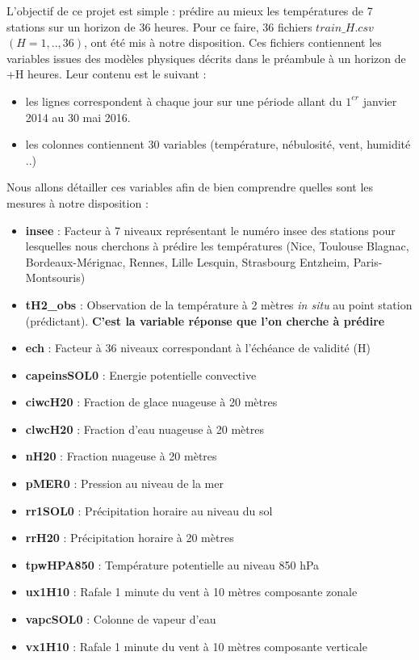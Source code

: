 \documentclass[14pt, openany]{article}
\begin{document}
L'objectif de ce projet est simple : prédire au mieux les températures de 7 stations sur un horizon de 36 heures. Pour ce faire, 36 fichiers $train\_H.csv$ $(H=1,..,36)$, ont été mis à notre disposition. Ces fichiers contiennent les variables issues des modèles physiques décrits dans le préambule à un horizon de +H heures. Leur contenu est le suivant :
\begin{itemize}
\item les lignes correspondent à chaque jour sur une période allant du $1^{er}$ janvier 2014 au 30 mai 2016.
\item les colonnes contiennent 30 variables (température, nébulosité, vent, humidité ..)
\end{itemize}
Nous allons détailler ces variables afin de bien comprendre quelles sont les mesures à notre disposition :
\begin{itemize}
\item \textbf{insee} : Facteur à 7 niveaux représentant le numéro insee des stations pour lesquelles nous cherchons à prédire les températures (Nice, Toulouse Blagnac, Bordeaux-Mérignac, Rennes, Lille Lesquin, Strasbourg Entzheim, Paris-Montsouris)
\item \textbf{tH2\_obs} : Observation de la température à 2 mètres \textit{in situ} au point station (prédictant). \textbf{C'est la variable réponse que l'on cherche à prédire}
\item \textbf{ech} : Facteur à 36 niveaux correspondant à l'échéance de validité (H)
\item \textbf{capeinsSOL0} : Energie potentielle convective
\item \textbf{ciwcH20} : Fraction de glace nuageuse à 20 mètres
\item \textbf{clwcH20} : Fraction d'eau nuageuse à 20 mètres
\item \textbf{nH20} : Fraction nuageuse à 20 mètres
\item \textbf{pMER0} : Pression au niveau de la mer
\item \textbf{rr1SOL0} : Précipitation horaire au niveau du sol
\item \textbf{rrH20} : Précipitation horaire à 20 mètres
\item \textbf{tpwHPA850} : Température potentielle au niveau 850 hPa
\item \textbf{ux1H10} : Rafale 1 minute du vent à 10 mètres composante zonale
\item \textbf{vapcSOL0} : Colonne de vapeur d'eau
\item \textbf{vx1H10} : Rafale 1 minute du vent à 10 mètres composante verticale

\end{itemize}
\end{document}
